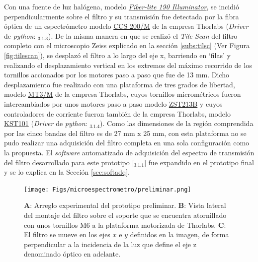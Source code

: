 Con una fuente de luz halógena, modelo \href{https://dolan-jenner.com/products/fiber-lite-190}{\textit{Fiber-lite 190 Illuminator}}, se incidió perpendicularmente sobre el filtro y su transmisión fue detectada por la fibra óptica de un espectrómetro modelo \href{https://www.thorlabs.com/thorproduct.cfm?partnumber=CCS200/M#ad-image-0}{CCS 200/M} de la empresa Thorlabs (\textit{Driver} de \textit{python}: \href{https://github.com/jrr1984/Prototipo0\_S-D\_SpectralGUI/blob/master/syst/CCS200.py}{\faGithub$_{3.1.3}$}). De la misma manera en que se realizó el \textit{Tile Scan} del filtro completo con el microscopio Zeiss explicado en la sección \ref{subs:tilsc} (Ver Figura \ref{fig:tilescan}), se desplazó el filtro a lo largo del eje x, barriendo en `filas' y realizando el desplazamiento vertical en los extremos del máximo recorrido de los tornillos accionados por los motores paso a paso que fue de 13 mm. Dicho desplazamiento fue realizado con una plataforma de tres grados de libertad, modelo \href{https://www.thorlabs.com/thorproduct.cfm?partnumber=MT3/M}{MT3/M} de la empresa Thorlabs, cuyos tornillos micrométricos fueron intercambiados por unos motores paso a paso modelo \href{https://www.thorlabs.com/thorproduct.cfm?partnumber=ZST213B}{ZST213B} y cuyos controladores de corriente fueron también de la empresa Thorlabs, modelo \href{https://www.thorlabs.com/thorproduct.cfm?partnumber=KST101}{KST101} (\textit{Driver} de \textit{python}: \href{https://github.com/jrr1984/Prototipo0\_S-D\_SpectralGUI/blob/master/barrido/std/thor\_stepm.py}{\faGithub$_{3.1.4}$}). Como las dimensiones de la región comprendida por las cinco bandas del filtro es de 27 mm x 25 mm, con esta plataforma no se pudo realizar una adquisición del filtro completa en una sola configuración como la propuesta. El \textit{software} automatizado de adquisición del espectro de transmisión del filtro desarrollado para este prototipo [\href{https://github.com/jrr1984/Prototipo0\_S-D\_SpectralGUI/tree/master/barrido/std}{\faGithub$_{3.1.1}$}] fue expandido en el prototipo final y se lo explica en la Sección \ref{sec:softadq}.

\begin{figure}[H]
\centering
\texttt{[image: Figs/microespectrometro/preliminar.png]}
\caption{\textbf{A}: Arreglo experimental del prototipo preliminar. \textbf{B}: Vista lateral del montaje del filtro sobre el soporte que se encuentra atornillado con unos tornillos M6 a la plataforma motorizada de Thorlabs. \textbf{C}: El filtro se mueve en los ejes $\textit{x}$ e $\textit{y}$ definidos en la imagen, de forma perpendicular a la incidencia de la luz que define el eje z denominado óptico en adelante.}
\label{fig:p}
\end{figure}

